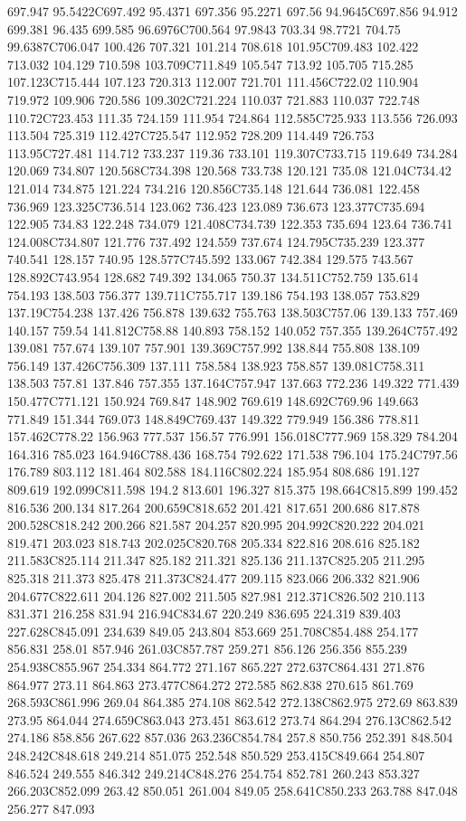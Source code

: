 697.947 95.5422C697.492 95.4371 697.356 95.2271 697.56 94.9645C697.856 94.912 699.381 96.435 699.585 96.6976C700.564 97.9843 703.34 98.7721 704.75 99.6387C706.047 100.426 707.321 101.214 708.618 101.95C709.483 102.422 713.032 104.129 710.598 103.709C711.849 105.547 713.92 105.705 715.285 107.123C715.444 107.123 720.313 112.007 721.701 111.456C722.02 110.904 719.972 109.906 720.586 109.302C721.224 110.037 721.883 110.037 722.748 110.72C723.453 111.35 724.159 111.954 724.864 112.585C725.933 113.556 726.093 113.504 725.319 112.427C725.547 112.952 728.209 114.449 726.753 113.95C727.481 114.712 733.237 119.36 733.101 119.307C733.715 119.649 734.284 120.069 734.807 120.568C734.398 120.568 733.738 120.121 735.08 121.04C734.42 121.014 734.875 121.224 734.216 120.856C735.148 121.644 736.081 122.458 736.969 123.325C736.514 123.062 736.423 123.089 736.673 123.377C735.694 122.905 734.83 122.248 734.079 121.408C734.739 122.353 735.694 123.64 736.741 124.008C734.807 121.776 737.492 124.559 737.674 124.795C735.239 123.377 740.541 128.157 740.95 128.577C745.592 133.067 742.384 129.575 743.567 128.892C743.954 128.682 749.392 134.065 750.37 134.511C752.759 135.614 754.193 138.503 756.377 139.711C755.717 139.186 754.193 138.057 753.829 137.19C754.238 137.426 756.878 139.632 755.763 138.503C757.06 139.133 757.469 140.157 759.54 141.812C758.88 140.893 758.152 140.052 757.355 139.264C757.492 139.081 757.674 139.107 757.901 139.369C757.992 138.844 755.808 138.109 756.149 137.426C756.309 137.111 758.584 138.923 758.857 139.081C758.311 138.503 757.81 137.846 757.355 137.164C757.947 137.663 772.236 149.322 771.439 150.477C771.121 150.924 769.847 148.902 769.619 148.692C769.96 149.663 771.849 151.344 769.073 148.849C769.437 149.322 779.949 156.386 778.811 157.462C778.22 156.963 777.537 156.57 776.991 156.018C777.969 158.329 784.204 164.316 785.023 164.946C788.436 168.754 792.622 171.538 796.104 175.24C797.56 176.789 803.112 181.464 802.588 184.116C802.224 185.954 808.686 191.127 809.619 192.099C811.598 194.2 813.601 196.327 815.375 198.664C815.899 199.452 816.536 200.134 817.264 200.659C818.652 201.421 817.651 200.686 817.878 200.528C818.242 200.266 821.587 204.257 820.995 204.992C820.222 204.021 819.471 203.023 818.743 202.025C820.768 205.334 822.816 208.616 825.182 211.583C825.114 211.347 825.182 211.321 825.136 211.137C825.205 211.295 825.318 211.373 825.478 211.373C824.477 209.115 823.066 206.332 821.906 204.677C822.611 204.126 827.002 211.505 827.981 212.371C826.502 210.113 831.371 216.258 831.94 216.94C834.67 220.249 836.695 224.319 839.403 227.628C845.091 234.639 849.05 243.804 853.669 251.708C854.488 254.177 856.831 258.01 857.946 261.03C857.787 259.271 856.126 256.356 855.239 254.938C855.967 254.334 864.772 271.167 865.227 272.637C864.431 271.876 864.977 273.11 864.863 273.477C864.272 272.585 862.838 270.615 861.769 268.593C861.996 269.04 864.385 274.108 862.542 272.138C862.975 272.69 863.839 273.95 864.044 274.659C863.043 273.451 863.612 273.74 864.294 276.13C862.542 274.186 858.856 267.622 857.036 263.236C854.784 257.8 850.756 252.391 848.504 248.242C848.618 249.214 851.075 252.548 850.529 253.415C849.664 254.807 846.524 249.555 846.342 249.214C848.276 254.754 852.781 260.243 853.327 266.203C852.099 263.42 850.051 261.004 849.05 258.641C850.233 263.788 847.048 256.277 847.093 